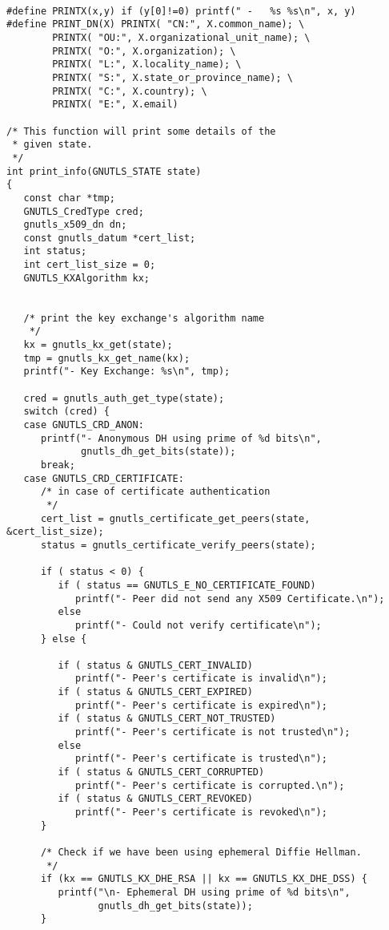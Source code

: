 \begin{verbatim}

#define PRINTX(x,y) if (y[0]!=0) printf(" -   %s %s\n", x, y)
#define PRINT_DN(X) PRINTX( "CN:", X.common_name); \
        PRINTX( "OU:", X.organizational_unit_name); \
        PRINTX( "O:", X.organization); \
        PRINTX( "L:", X.locality_name); \
        PRINTX( "S:", X.state_or_province_name); \
        PRINTX( "C:", X.country); \
        PRINTX( "E:", X.email)

/* This function will print some details of the
 * given state.
 */
int print_info(GNUTLS_STATE state)
{
   const char *tmp;
   GNUTLS_CredType cred;
   gnutls_x509_dn dn;
   const gnutls_datum *cert_list;
   int status;
   int cert_list_size = 0;
   GNUTLS_KXAlgorithm kx;


   /* print the key exchange's algorithm name
    */
   kx = gnutls_kx_get(state);
   tmp = gnutls_kx_get_name(kx);
   printf("- Key Exchange: %s\n", tmp);

   cred = gnutls_auth_get_type(state);
   switch (cred) {
   case GNUTLS_CRD_ANON:
      printf("- Anonymous DH using prime of %d bits\n",
             gnutls_dh_get_bits(state));
      break;
   case GNUTLS_CRD_CERTIFICATE:
      /* in case of certificate authentication
       */
      cert_list = gnutls_certificate_get_peers(state, &cert_list_size);
      status = gnutls_certificate_verify_peers(state);
      
      if ( status < 0) {
         if ( status == GNUTLS_E_NO_CERTIFICATE_FOUND)
            printf("- Peer did not send any X509 Certificate.\n");
         else
            printf("- Could not verify certificate\n");
      } else {

         if ( status & GNUTLS_CERT_INVALID)
            printf("- Peer's certificate is invalid\n");
         if ( status & GNUTLS_CERT_EXPIRED)
            printf("- Peer's certificate is expired\n");
         if ( status & GNUTLS_CERT_NOT_TRUSTED)
            printf("- Peer's certificate is not trusted\n");
         else
            printf("- Peer's certificate is trusted\n");
         if ( status & GNUTLS_CERT_CORRUPTED)
            printf("- Peer's certificate is corrupted.\n");
         if ( status & GNUTLS_CERT_REVOKED)
            printf("- Peer's certificate is revoked\n");
      }

      /* Check if we have been using ephemeral Diffie Hellman.
       */
      if (kx == GNUTLS_KX_DHE_RSA || kx == GNUTLS_KX_DHE_DSS) {
         printf("\n- Ephemeral DH using prime of %d bits\n",
                gnutls_dh_get_bits(state));
      }


\end{verbatim}
